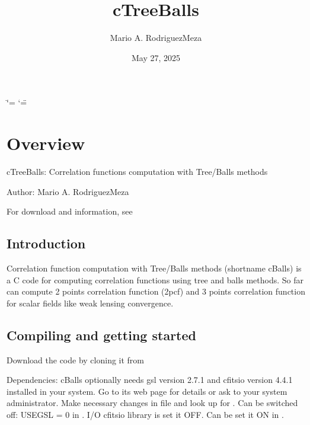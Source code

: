 \documentclass[letterpaper,10pt,english]{sphinxmanual}
\title{cTreeBalls}
\date{May 27, 2025}
\author{Mario A.\@{} Rodriguez\sphinxhyphen{}Meza}
\begin{document}
\ifdefined\shorthandoff
  \ifnum\catcode`\=\string=\active\shorthandoff{=}\fi
  \ifnum\catcode`\"=\active{}\fi
\fi

\pagestyle{empty}
\sphinxmaketitle
\pagestyle{plain}
\sphinxtableofcontents
\pagestyle{normal}
\label{\detokenize{index::doc}}


\sphinxstepscope


\chapter{Overview}
\label{\detokenize{overview:overview}}\label{\detokenize{overview::doc}}
\sphinxAtStartPar
cTreeBalls: Correlation functions computation with Tree/Balls methods

\sphinxAtStartPar
Author: Mario A. Rodriguez\sphinxhyphen{}Meza

\sphinxAtStartPar
For download and information, see 


\section{Introduction}
\label{\detokenize{overview:introduction}}
\sphinxAtStartPar
Correlation function computation with Tree/Balls methods (short\sphinxhyphen{}name cBalls) is a C code for computing correlation functions using tree and balls methods. So far can compute 2 points correlation function (2pcf) and 3 points correlation function for scalar fields like weak lensing convergence.


\section{Compiling and getting started}
\label{\detokenize{overview:compiling-and-getting-started}}
\sphinxAtStartPar
Download the code by cloning it from 

\sphinxAtStartPar
Dependencies: cBalls optionally needs gsl version 2.7.1 and cfitsio version 4.4.1 installed in your system. Go to its web page  for details or ask to your system administrator. Make necessary changes in  file and look up for . Can be switched off: USEGSL = 0 in . I/O cfitsio library is set it OFF. Can be set it ON in .
\end{document}
